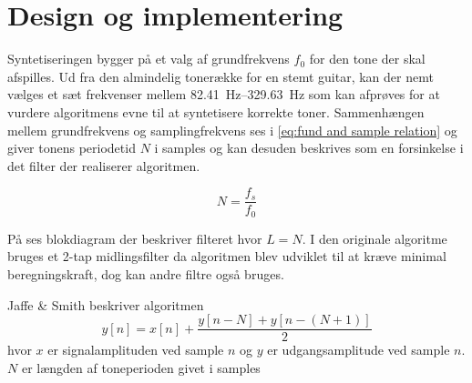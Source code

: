 \section{Design og implementering}

Syntetiseringen bygger på et valg af grundfrekvens \(f_0\) for den tone der skal afspilles. Ud fra den almindelig tonerække for en stemt guitar\cite{GuitarTunings}, kan der nemt vælges et sæt frekvenser mellem \SI{82.41}{\hertz}--\SI{329.63}{\hertz} som kan afprøves for at vurdere algoritmens evne til at syntetisere korrekte toner.
Sammenhængen mellem grundfrekvens og samplingfrekvens ses i \ref{eq:fund and sample relation} og giver tonens periodetid \(N\) i samples og kan desuden beskrives som en forsinkelse i det filter der realiserer algoritmen.

\begin{equation}\label{eq:fund and sample relation}
  N = \frac{f_s}{f_0}
\end{equation}

På  ses blokdiagram der beskriver filteret hvor \(L = N\). I den originale algoritme bruges et 2-tap midlingsfilter da algoritmen blev udviklet til at kræve minimal beregningskraft\cite{Karplus1983}, dog kan andre filtre også bruges.


Jaffe \& Smith beskriver algoritmen
\begin{equation}
  y[n] = x[n] + \frac{y[n - N] + y\left[n -(N + 1)\right]}{2}
\end{equation}
hvor \(x\) er signalamplituden ved sample \(n\) og \(y\) er udgangsamplitude ved sample \(n\).
\(N\) er længden af toneperioden givet i samples \cite{Jaffe1983}
